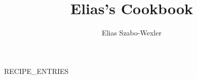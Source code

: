 \documentclass[
a4paper,
11pt
]{article}
\begin{document}
\title{Elias's Cookbook}
\author{Elias Szabo-Wexler}
\maketitle

\tableofcontents

{{RECIPE_ENTRIES}}
\end{document}
